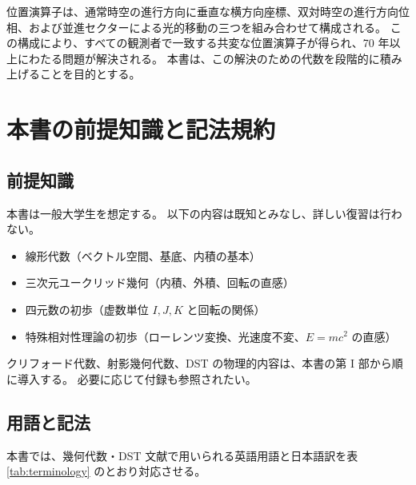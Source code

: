 \documentclass[dvipdfmx,a4paper,oneside]{jsbook}
\numberwithin{equation}{chapter}
\begin{document}
位置演算子は、通常時空の進行方向に垂直な横方向座標、双対時空の進行方向位相、および並進セクターによる光的移動の三つを組み合わせて構成される。
この構成により、すべての観測者で一致する共変な位置演算子が得られ、70 年以上にわたる問題が解決される。
本書は、この解決のための代数を段階的に積み上げることを目的とする。

\section*{本書の前提知識と記法規約}

\subsection*{前提知識}

本書は一般大学生を想定する。
以下の内容は既知とみなし、詳しい復習は行わない。

\begin{itemize}[leftmargin=2em]
  \item 線形代数（ベクトル空間、基底、内積の基本）
  \item 三次元ユークリッド幾何（内積、外積、回転の直感）
  \item 四元数の初歩（虚数単位 \(I, J, K\) と回転の関係）
  \item 特殊相対性理論の初歩（ローレンツ変換、光速度不変、\(E = mc^2\) の直感）
\end{itemize}

クリフォード代数、射影幾何代数、DST の物理的内容は、本書の第 I 部から順に導入する。
必要に応じて付録も参照されたい。

\subsection*{用語と記法}

本書では、幾何代数・DST 文献で用いられる英語用語と日本語訳を表 \ref{tab:terminology} のとおり対応させる。
\end{document}
